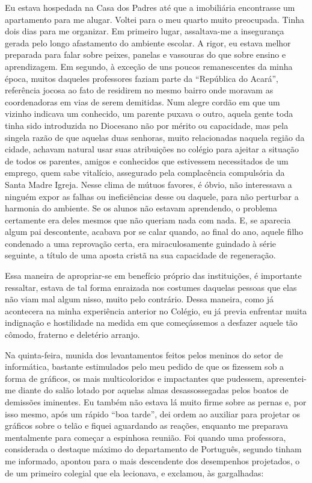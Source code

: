 Eu estava hospedada na Casa dos Padres até que a imobiliária encontrasse um apartamento para me alugar.
Voltei para o meu quarto muito preocupada.
Tinha dois dias para me organizar.
Em primeiro lugar, assaltava-me a insegurança gerada pelo longo afastamento do ambiente escolar.
A rigor, eu estava melhor preparada para falar sobre peixes, panelas e vassouras do que sobre ensino e aprendizagem.
Em segundo, à exceção de uns poucos remanescentes da minha época, muitos daqueles professores faziam parte da ``República do Acará'', referência jocosa ao fato de residirem no mesmo bairro onde moravam as coordenadoras em vias de serem demitidas.
Num alegre cordão em que um vizinho indicava um conhecido, um parente puxava o outro, aquela gente toda tinha sido introduzida no Diocesano não por mérito ou capacidade, mas pela singela razão de que aquelas duas senhoras, muito relacionadas naquela região da cidade, achavam natural usar suas atribuições no colégio para ajeitar a situação de todos os parentes, amigos e conhecidos que estivessem necessitados de um emprego, quem sabe vitalício, assegurado pela complacência compulsória da Santa Madre Igreja.
Nesse clima de mútuos favores, é óbvio, não interessava a ninguém expor as falhas ou ineficiências desse ou daquele, para não perturbar a harmonia do ambiente.
Se os alunos não estavam aprendendo, o problema certamente era deles mesmos que não queriam nada com nada.
E, se aparecia algum pai descontente, acabava por se calar quando, ao final do ano, aquele filho condenado a uma reprovação certa, era miraculosamente guindado à série seguinte, a título de uma aposta cristã na sua capacidade de regeneração.

Essa maneira de apropriar-se em benefício próprio das instituições, é importante ressaltar, estava de tal forma enraizada nos costumes daquelas pessoas que elas não viam mal algum nisso, muito pelo contrário.
Dessa maneira, como já acontecera na minha experiência anterior no Colégio, eu já previa enfrentar muita indignação e hostilidade na medida em que começássemos a desfazer aquele tão cômodo, fraterno e deletério arranjo.

Na quinta-feira, munida dos levantamentos feitos pelos meninos do setor de informática, bastante estimulados pelo meu pedido de que os fizessem sob a forma de gráficos, os mais multicoloridos e impactantes que pudessem, apresentei-me diante do salão lotado por aquelas almas desassossegadas pelos boatos de demissões iminentes.
Eu também não estava lá muito firme sobre as pernas e, por isso mesmo, após um rápido ``boa tarde'', dei ordem ao auxiliar para projetar os gráficos sobre o telão e fiquei aguardando as reações, enquanto me preparava mentalmente para começar a espinhosa reunião.
Foi quando uma professora, considerada o destaque máximo do departamento de Português, segundo tinham me informado, apontou para o mais descendente dos desempenhos projetados, o de um primeiro colegial que ela lecionava, e exclamou, às gargalhadas:

